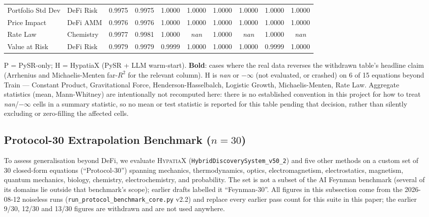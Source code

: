 \documentclass[twoside,11pt]{article}
\begin{document}
\begin{table}[htbp]
{\begin{tabular}{llcccccccc}
Portfolio Std Dev & DeFi Risk & 0.9975 & 0.9975 & 1.0000 & 1.0000 & 1.0000 & 1.0000 & 1.0000 & 1.0000 \\
Price Impact & DeFi AMM & 0.9976 & 0.9976 & 1.0000 & 1.0000 & 1.0000 & 1.0000 & 1.0000 & 1.0000 \\
Rate Law & Chemistry & 0.9977 & 0.9981 & 1.0000 & \textit{nan} & 1.0000 & \textit{nan} & 1.0000 & \textit{nan} \\
Value at Risk & DeFi Risk & 0.9979 & 0.9979 & 0.9999 & 1.0000 & 1.0000 & 1.0000 & 0.9999 & 1.0000 \\
\bottomrule
\end{tabular}%
}%
\par\vspace{4pt}
{\footnotesize\noindent
P = PySR-only; H = HypatiaX (PySR + LLM warm-start). \textbf{Bold}: cases
where the real data reverses the withdrawn table's headline claim (Arrhenius
and Michaelis-Menten far-$R^2$ for the relevant column). H is \textit{nan}
or $-\infty$ (not evaluated, or crashed) on 6 of 15 equations beyond Train ---
Constant Product, Gravitational Force, Henderson-Hasselbalch, Logistic
Growth, Michaelis-Menten, Rate Law. Aggregate statistics (mean, Mann-Whitney)
are intentionally not recomputed here: there is no established convention
in this project for how to treat \textit{nan}/$-\infty$ cells in a summary
statistic, so no mean or test statistic is reported for this table pending
that decision, rather than silently excluding or zero-filling the affected
cells.
}
\end{table}

\subsection{Protocol-30 Extrapolation Benchmark ($n=30$)}\label{subsec:feynman-extrapolation-benchmark-n30}
\label{sec:feynman30}

To assess generalisation beyond DeFi, we evaluate \textsc{HypatiaX}
(\texttt{HybridDiscoverySystem\_v50\_2}) and five other methods on a custom set of 30 closed-form
equations (``Protocol-30'') spanning mechanics, thermodynamics, optics, electromagnetism,
electrostatics, magnetism, quantum mechanics, biology, chemistry,
electrochemistry, and probability. The set is not a subset of the AI Feynman
benchmark (several of its domains lie outside that benchmark's scope); earlier drafts labelled it ``Feynman-30''. All figures in this subsection come from
the 2026-08-12 noiseless runs (\texttt{run\_protocol\_benchmark\_core.py}
v2.2) and replace every earlier pass count for this suite in this paper; the
earlier 9/30, 12/30 and 13/30 figures are withdrawn and are not used anywhere.
\end{document}
